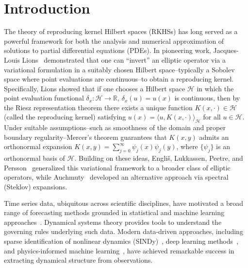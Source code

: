 \documentclass[11pt,a4paper]{article}
\newcommand{\R}{\mathbb{R}}
\begin{document}
\section{Introduction}\label{sec:introduction}

The theory of reproducing kernel Hilbert spaces (RKHSs) has long served as a powerful framework for both the analysis and numerical approximation of solutions to partial differential equations (PDEs). In pioneering work, Jacques-Louis Lions~\cite{Lions1986,Lions1988} demonstrated that one can ``invert'' an elliptic operator via a variational formulation in a suitably chosen Hilbert space--typically a Sobolev space where point evaluations are continuous--to obtain a reproducing kernel. Specifically, Lions showed that if one chooses a Hilbert space $\mathcal{H}$ in which the point evaluation functional $\delta_x: \mathcal{H} \to \R$, $\delta_x(u) = u(x)$ is continuous, then by the Riesz representation theorem there exists a unique function $K(x,\cdot) \in \mathcal{H}$ (called the reproducing kernel) satisfying $u(x) = \langle u, K(x,\cdot)\rangle_{\mathcal{H}}$ for all $u \in \mathcal{H}$. Under suitable assumptions--such as smoothness of the domain and proper boundary regularity--Mercer's theorem guarantees that $K(x,y)$ admits an orthonormal expansion $K(x,y) = \sum_{j=0}^\infty \psi_j(x)\psi_j(y)$, where $\{\psi_j\}$ is an orthonormal basis of $\mathcal{H}$. Building on these ideas, Engli\v{s}, Lukkassen, Peetre, and Persson~\cite{Englis2004} generalized this variational framework to a broader class of elliptic operators, while Auchmuty~\cite{Auchmuty2009} developed an alternative approach via spectral (Steklov) expansions.

Time series data, ubiquitous across scientific disciplines, have motivated a broad range of forecasting methods grounded in statistical and machine learning approaches~\cite{Kantz1997,Casdagli1989,Hudson1990,RicoMartinez1992,Grandstrand1995,Gonzalez1998,Chattopadhyay2019,Brunton2016,Pathak2017,Nielsen2019,Abarbanel2012,Pillonetto2011,Wang2011,Brunton2016pnas,Lusch2018,Callaham2021,Kaptanoglu2021,KutzBrunton2022}. Dynamical systems theory provides tools to understand the governing rules underlying such data. Modern data-driven approaches, including sparse identification of nonlinear dynamics (SINDy)~\cite{Brunton2016}, deep learning methods~\cite{Lusch2018,Chattopadhyay2019}, and physics-informed machine learning~\cite{KutzBrunton2022}, have achieved remarkable success in extracting dynamical structure from observations.
\end{document}
